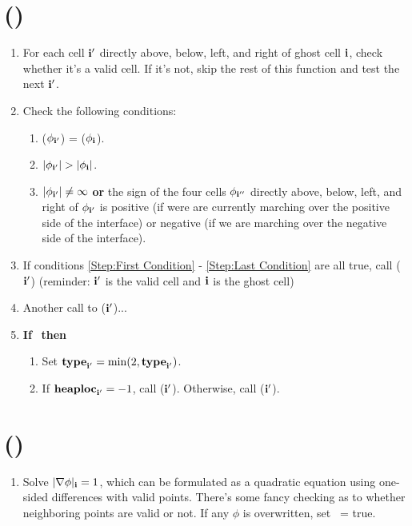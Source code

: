 \section{(\ib)}
\begin{enumerate}
\item For each cell ${\bf i}'$ directly above, below, left, and right of ghost cell ${\bf i}$, check whether it's a valid cell.  If it's not, skip the rest of this function and test the next ${\bf i}'$.
\item Check the following conditions:
\begin{enumerate}
\item \label{Step:First Condition} \sign($\phi_{{\bf i}'}$) = \sign($\phi_{\bf i}$).
\item $|\phi_{{\bf i}'}| > |\phi_{\bf i}|$.
\item \label{Step:Last Condition} $|\phi_{{\bf i}'}| \ne \infty$ {\bf or} the sign of the four cells $\phi_{{\bf i}''}$ directly above, below, left, and right of $\phi_{{\bf i}'}$ is positive (if were are currently marching over the positive side of the interface) or negative (if we are marching over the negative side of the interface).
\end{enumerate}
\item If conditions \ref{Step:First Condition} - \ref{Step:Last Condition} are all true, call (${\bf i}'$) (reminder: ${\bf i}'$ is the valid cell and ${\bf i}$ is the ghost cell)
\item Another call to (${\bf i}'$)...
\item {\bf If} \isnew~{\bf then}
\begin{enumerate}
\item Set ${\tt{\bf type}}_{{\bf i}'} = \min(2,{\tt{\bf type}}_{{\bf i}'})$.
\item If ${\tt{\bf heaploc}}_{{\bf i}'} = -1$, call \ADDNODE(${\bf i}'$).  Otherwise, call \UPDATENODE(${\bf i}'$).
\end{enumerate}
\end{enumerate}
\section{(\ib)}
\begin{enumerate}
\item Solve $|\nabla\phi|_{{\bf i}}=1$, which can be formulated as a quadratic equation using one-sided differences with valid points.  There's some fancy checking as to whether neighboring points are valid or not.  If any $\phi$ is overwritten, set \isnew~= true.
\end{enumerate}
